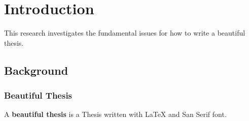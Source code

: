 \chapter{Introduction}
\label{chap:intro}

This research investigates the fundamental issues for how to write a beautiful thesis.

\section{Background}
\label{sec:intro_background}

\subsection{Beautiful Thesis}
\label{sec:intro_bt}

A \textbf{beautiful thesis} \cite{6083078} is a Thesis written with {\LaTeX} and San Serif font.




